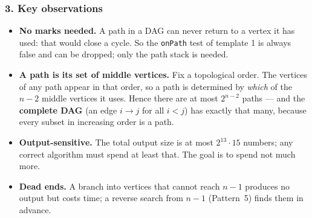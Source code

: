 \subsubsection*{3. Key observations}

\begin{itemize}[leftmargin=*]
    \item \textbf{No marks needed.} A path in a DAG can never return to a vertex it has used: that would close a cycle. So the \texttt{onPath} test of template 1 is always false and can be dropped; only the path stack is needed.
    \item \textbf{A path is its set of middle vertices.} Fix a topological order. The vertices of any path appear in that order, so a path is determined by \emph{which} of the $n-2$ middle vertices it uses. Hence there are at most $2^{n-2}$ paths --- and the \textbf{complete DAG} (an edge $i \to j$ for all $i < j$) has exactly that many, because every subset in increasing order is a path.
    \item \textbf{Output-sensitive.} The total output size is at most $2^{13} \cdot 15$ numbers; any correct algorithm must spend at least that. The goal is to spend not much more.
    \item \textbf{Dead ends.} A branch into vertices that cannot reach $n-1$ produces no output but costs time; a reverse search from $n-1$ (Pattern~5) finds them in advance.
\end{itemize}

\begin{diagrambox}
\end{diagrambox}

